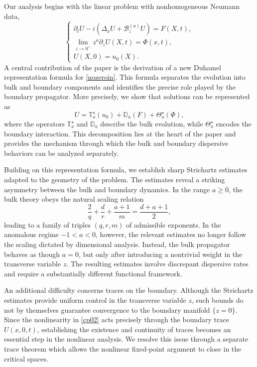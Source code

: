 \documentclass[11pt,letter]{amsart}
\newcommand{\Ba}{\mathscr B_z^{(a)}}
\numberwithin{equation}{section}
\numberwithin{equation}{section}
\begin{document}
Our analysis begins with the linear problem with nonhomogeneous Neumann data,
\begin{equation}\label{nozeroin}
\begin{cases}
\partial_tU-i(\Delta_x U+\Ba U)=F(X,t),\\
\displaystyle \lim_{z\to0^+} z^a\partial_zU(X,t)=\Phi(x,t),\\
U(X,0)=u_0(X).
\end{cases}
\end{equation}
A central contribution of the paper is the derivation of a new Duhamel representation formula for \eqref{nozeroin}. This formula separates the evolution into bulk and boundary components and identifies the precise role played by the boundary propagator. More precisely, we show that solutions can be represented as
\[
U= \mathbb T_a^\star(u_0)+\mathbb D_a(F)+\Theta_a^\star(\Phi),
\]
where the operators $\mathbb T_a^\star$ and $\mathbb D_a$ describe the bulk evolution, while $\Theta_a^\star$ encodes the boundary interaction. This decomposition lies at the heart of the paper and provides the mechanism through which the bulk and boundary dispersive behaviors can be analyzed separately.

Building on this representation formula, we establish sharp Strichartz estimates adapted to the geometry of the problem. The estimates reveal a striking asymmetry between the bulk and boundary dynamics. In the range \(a\geq0\), the bulk theory obeys the natural scaling relation
\[
\frac{2}{q}+\frac{d}{r}+\frac{a+1}{m}
=\frac{d+a+1}{2},
\]
leading to a  family of triples $(q,r,m)$ of admissible exponents. In the anomalous regime \(-1<a<0\), however, the relevant estimates no longer follow the scaling dictated by dimensional analysis. Instead, the bulk propagator behaves as though \(a=0\), but only after introducing a nontrivial weight in the transverse variable \(z\). The resulting estimates involve discrepant dispersive rates and require a substantially different functional framework.

An additional difficulty concerns traces on the boundary. Although the Strichartz estimates provide uniform control in the transverse variable $z$, such bounds do not by themselves guarantee convergence to the boundary manifold $\{z=0\}$. Since the nonlinearity in \eqref{cp02} acts precisely through the boundary trace $U(x,0,t)$, establishing the existence and continuity of traces becomes an essential step in the nonlinear analysis. We resolve this issue through a separate trace theorem which allows the nonlinear fixed-point argument to close in the critical spaces.
\end{document}
